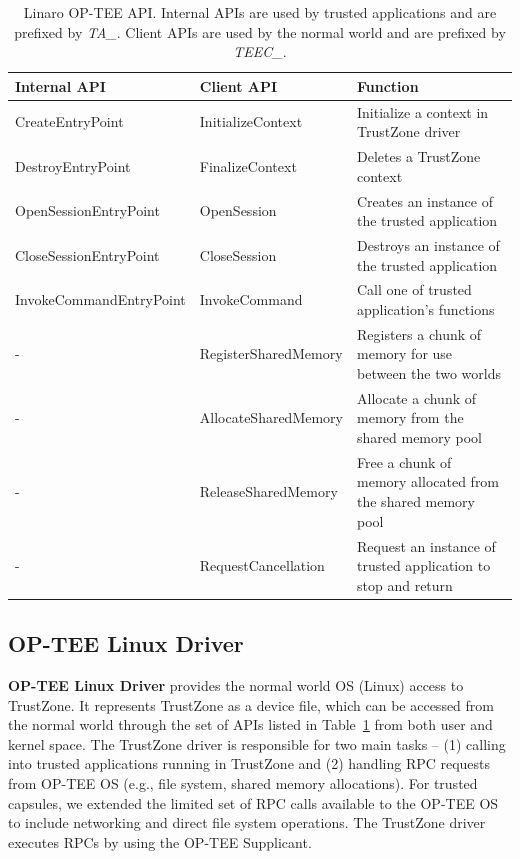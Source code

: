 \begin{table}[t]
\small
\begin{center}
\begin{tabular}{ |p{}|p{}|p{}| } 
 \hline
 \textbf{Internal API} & \textbf{Client API} & 
\textbf{Function} \\\hline\hline 
 CreateEntryPoint & InitializeContext & Initialize a context in TrustZone driver \\\hline
 DestroyEntryPoint & FinalizeContext & Deletes a TrustZone context\\\hline
 OpenSessionEntryPoint & OpenSession & Creates an instance of the 
trusted application \\\hline
 CloseSessionEntryPoint & CloseSession & Destroys an instance of the 
trusted application \\\hline
 InvokeCommandEntryPoint & InvokeCommand & Call one of trusted 
application's functions \\\hline
 - & RegisterSharedMemory & Registers a chunk of memory for use between 
the two worlds\\\hline
 - & AllocateSharedMemory & Allocate a chunk of memory from the shared 
memory pool\\\hline
 - & ReleaseSharedMemory & Free a chunk of memory allocated from the 
shared memory pool\\\hline
 - & RequestCancellation & Request an instance of trusted application to 
stop and return\\\hline
\end{tabular}
\caption[Linaro OP-TEE API.]{Linaro OP-TEE API. Internal APIs are used by trusted applications 
and are prefixed by \textit{TA\_}. Client APIs are used by the normal world and are prefixed 
by \textit{TEEC\_}.} 
\label{Tbl-GlobalPlatformAPI}
\end{center}
\end{table}

\subsection{OP-TEE Linux Driver}

\textbf{OP-TEE Linux Driver} provides the normal world \ac{OS} (Linux) access to TrustZone. 
It represents TrustZone as a device file, which can be accessed from the normal world through 
the set of APIs listed in Table~\ref{Tbl-GlobalPlatformAPI} from both user and kernel space. 
The TrustZone driver is responsible for two main tasks -- (1) calling into trusted applications 
running in TrustZone and (2) handling RPC requests from OP-TEE OS (e.g., file system, shared memory 
allocations). For trusted capsules, we extended the limited set of RPC calls available to the 
OP-TEE OS to include networking and direct file system operations. The TrustZone driver executes 
RPCs by using the OP-TEE Supplicant. 


